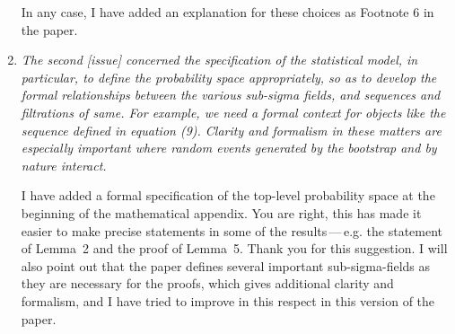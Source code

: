 \documentclass[12pt]{article}
\begin{document}
\begin{enumerate}
  In any case, I have added an explanation for these choices as
  Footnote 6 in the paper.

\item \textit{The second [issue] concerned the specification of the
    statistical model, in particular, to define the probability space
    appropriately, so as to develop the formal relationships between
    the various sub-sigma fields, and sequences and filtrations of
    same. For example, we need a formal context for objects like the
    sequence defined in equation (9). Clarity and formalism in these
    matters are especially important where random events generated by
    the bootstrap and by nature interact.}

  I have added a formal specification of the top-level probability
  space at the beginning of the mathematical appendix. You are
  right, this has made it easier to make precise statements in some
  of the results\,---\,e.g. the statement of Lemma~2 and the proof
  of Lemma~5. Thank you for this suggestion.  I will also point out
  that the paper defines several important sub-sigma-fields as they
  are necessary for the proofs, which gives additional clarity and
  formalism, and I have tried to improve in this respect in this
  version of the paper.

\end{enumerate}


\end{document}
